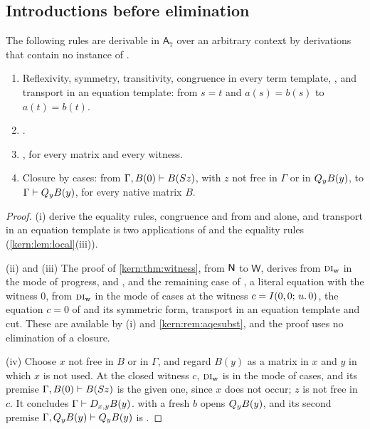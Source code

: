 \subsection{Introductions before elimination}
\label{kern:sec:aqeintro}

\begin{lemma}
\label{kern:lem:aqeintro}
The following rules are derivable in $\mathsf{A}_7$ over an arbitrary
context by derivations that contain no instance of .
\begin{enumerate}[label=\textup{(\roman*)}]
\item Reflexivity, symmetry, transitivity, congruence in every term template,
 , and transport in an equation template: from $s=t$ and
 $a(s)=b(s)$ to $a(t)=b(t)$.
\item {}.
\item {}, for every matrix and every witness.
\item Closure by cases: from $\Gamma,B(0)\vdash B(S z)$, with $z$ not
 free in $\Gamma$ or in $Q_{y}B(y)$, to $\Gamma\vdash Q_{y}B(y)$, for every
 native matrix $B$.
\end{enumerate}
\end{lemma}

\begin{proof}
(i)  derive the equality rules,
congruence and  from  and  alone,
and transport in an equation template is two applications of 
and the equality rules (\cref{kern:lem:local}(iii)).

(ii) and (iii) The proof of \cref{kern:thm:witness}, from $\mathsf{N}$ to
$\mathsf{W}$, derives  from $\rulename{DI}_{\mathrm{w}}$ in the
mode of progress,  and , and the remaining case of
, a literal equation with the witness $0$, from
$\rulename{DI}_{\mathrm{w}}$ in the mode of cases at the witness
$c=I(0,0;\,u.\,0)$, the equation $c=0$ of  and its symmetric
form, transport in an equation template and cut.  These are available by
(i) and \cref{kern:rem:aqesubst}, and the proof uses no elimination of a
closure.

(iv) Choose $x$ not free in $B$ or in $\Gamma$, and regard $B(y)$ as a
matrix in $x$ and $y$ in which $x$ is not used.  At the closed witness $c$,
$\rulename{DI}_{\mathrm{w}}$ is in the mode of cases, and its premise
$\Gamma,B(0)\vdash B(S z)$ is the given one, since $x$ does not occur;
$z$ is not free in $c$.  It concludes $\Gamma\vdash D_{x,y}B(y)$.
 with a fresh $b$ opens $Q_{y}B(y)$, and its second premise
$\Gamma,Q_{y}B(y)\vdash Q_{y}B(y)$ is .
\end{proof}

